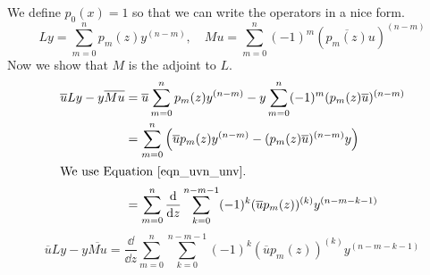 {\begin{Solution}
  We define $p_0(x) = 1$ so that we can write the operators in a nice form.
  \[
  L y = \sum_{m=0}^n p_m(z) y^{(n-m)}, \quad
  M u = \sum_{m=0}^n (-1)^m (\overline{p_m(z)} u)^{(n-m)}
  \]
  Now we show that $M$ is the adjoint to $L$.
  \begin{align*}
    \overline{u} L y - y \overline{M u}
    &= \overline{u} \sum_{m=0}^n p_m(z) y^{(n-m)}
    - y \sum_{m=0}^n (-1)^m (p_m(z) \overline{u})^{(n-m)} \\
    &= \sum_{m=0}^n \left( \overline{u} p_m(z) y^{(n-m)} 
      - (p_m(z) \overline{u})^{(n-m)} y 
    \right) \\
    \intertext{We use Equation~\ref{eqn_uvn_unv}.}
    &= \sum_{m=0}^n \frac{\mathrm{d}}{\mathrm{d} z} \sum_{k=0}^{n-m-1} 
    (-1)^k (\overline{u} p_m(z))^{(k)} y^{(n-m-k-1)}
  \end{align*}
  \[
  \boxed{
    \overline{u} L y - y \overline{M u} = \frac{\dd}{\dd z} \sum_{m=0}^n \sum_{k=0}^{n-m-1} 
    (-1)^k (\overline{u} p_m(z))^{(k)} y^{(n-m-k-1)}
    }
  \]
\end{Solution}








\raggedbottom
}
